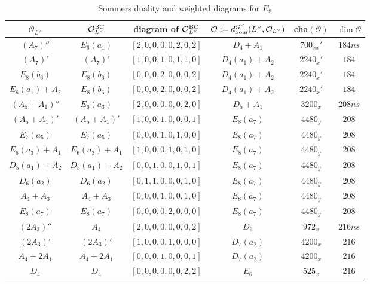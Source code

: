 \documentclass[reqno,12pt]{amsart}
\numberwithin{equation}{section}
\theoremstyle{plain}
\theoremstyle{definition}
\begin{document}
\begin{table}[htbp]\caption{Sommers duality and weighted diagrams for $ E_8$ }
	\label{tabchare8}
	\centering

	\renewcommand{\arraystretch}{1.3}
	\setlength\tabcolsep{5pt}
\small{	\begin{tabular}{|c|c|c|c|c|c|}
		\hline $\mathcal{O}_{L^\vee}$  & $\mathcal{O}_{L^\vee}^{\rm BC} $ & diagram of $\mathcal{O}_{L^\vee}^{\rm BC} $ &$\mathcal{O}:=d_{\rm Som}^{G^\vee}(L^\vee, \mathcal{O}_{L^\vee})$ &  cha$(\mathcal{O})$ &  $\dim \mathcal{O}$  \\ \hline

$(A_7)''$
&    $E_6(a_1)$ &$[2,0,0,0,0,2,0,2]$&$D_4+A_1$  &  $ 700_{xx}'$  &   $184ns$ \\

$(A_7)'$
& $(A_7)'$&$[1,0,0,1,0,1,1,0]$& $D_4(a_1)+A_2$  &  $ 2240_{x}'$  &  $184$ \\
$E_8(b_6)$ &$E_8(b_6)$
&$[0,0,0,2,0,0,0,2]$& $D_4(a_1)+A_2$  & $ 2240_{x}'$  &   $184$ \\
$E_6(a_1)+A_2$
& $E_8(b_6)$&$[0,0,0,2,0,0,0,2]$& $D_4(a_1)+A_2$  & $ 2240_{x}'$  &   $184$ \\
\hline

$(A_5+A_1)''$
& $E_6(a_3)$ &$[2,0,0,0,0,0,2,0]$& $D_5+A_1$  &  $ 3200_{x}$  &  $208ns$ \\
$(A_5+A_1)'$
& $(A_5+A_1)'$
&$[1,0,0,1,0,0,0,1]$& $E_8(a_7)$  & $ 4480_y$  &  $208$ \\
$E_7(a_5)$
& $E_7(a_5)$
&$[0,0,0,1,0,1,0,0]$&$E_8(a_7)$  & $ 4480_y$  &   $208$ \\
$E_6(a_3)+A_1$
& $E_6(a_3)+A_1$
&$[1,0,0,0,1,0,1,0]$&$E_8(a_7)$  &  $ 4480_y$  &  $208$ \\
$D_5(a_1)+A_2$
&$D_5(a_1)+A_2$
&$[0,0,1,0,0,1,0,1]$ &$E_8(a_7)$  & $ 4480_y$  &   $208$ \\
$D_6(a_2)$
& $D_6(a_2)$
&$[0,1,1,0,0,0,1,0]$&$E_8(a_7)$  & $ 4480_y$  &   $208$ \\
$A_4+A_3$
&$A_4+A_3$
&$[0,0,0,1,0,0,1,0]$& $E_8(a_7)$  &  $ 4480_y$  &  $208$ \\
 $E_8(a_7)$  & $E_8(a_7)$&$[0,0,0,0,2,0,0,0]$&$E_8(a_7)$  &  $ 4480_y$  &  $208$ \\
\hline

$(2A_3)''$& $A_4$
&$[2,0,0,0,0,0,0,2]$&$D_6$  &  $ 972_{x}$  &   $216ns$ \\
$(2A_3)'$
&$(2A_3)'$
&$[1,0,0,0,1,0,0,0]$& $D_7(a_2)$  &  $ 4200_x$  &   $216$ \\
$A_4+2A_1$
& $A_4+2A_1$
&$[0,0,0,1,0,0,0,1]$&$D_7(a_2)$  &  $ 4200_x$  &  $216$ \\
$D_4$
&$D_4$
&$[0,0,0,0,0,0,2,2]$& $E_6$  &  $ 525_x$  &  $216$ \\
\hline


\end{tabular}}
\end{table}
\end{document}
